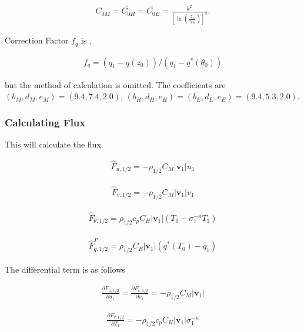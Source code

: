 \begin{eqnarray}
C_{0M}  =  \widetilde{C_{0H}}  =  \widetilde{C_{0E}}  =
       \frac{k^2}{\left[\ln \left(\frac{z_1}{z_{0M}}\right)\right]^2 } .
\end{eqnarray}

Correction Factor \(f_q\) is ,

\begin{eqnarray}
  f_q = (q_1 - q(z_0))/(q_1 - q^{\ast}(\theta_0))
\end{eqnarray}

but the method of calculation is omitted. The coefficients are
\(( b_M, d_M, e_M ) = ( 9.4, 7.4, 2.0 )\),
\(( b_H, d_H, e_H ) = ( b_E, d_E, e_E ) = ( 9.4, 5.3, 2.0 )\).

\hypertarget{calculating-flux}{%
\subsubsection{Calculating Flux}\label{calculating-flux}}

This will calculate the flux.

\begin{eqnarray}
\hat{F}_{u,1/2}  =  - \rho_{1/2} C_M |{\mathbf{v}}_1| u_1
\end{eqnarray}

\begin{eqnarray}
\hat{F}_{v,1/2}  =  - \rho_{1/2} C_M |{\mathbf{v}}_1| v_1
\end{eqnarray}

\begin{eqnarray}
\hat{F}_{\theta,1/2}  = \rho_{1/2} c_p C_H |{\mathbf{v}}_1|
                    \left( T_0 - \sigma_1^{-\kappa} T_1 \right)
\end{eqnarray}

\begin{eqnarray}
\hat{F}_{q,1/2}^P  =  \rho_{1/2} C_E |{\mathbf{v}}_1|
                    \left( q^*(T_0) - q_1 \right)
\end{eqnarray}

The differential term is as follows

\begin{eqnarray}
\frac{\partial{F_{u,1/2}}}{\partial {u_1}} = \frac{\partial{F_{v,1/2}}}{\partial {v_1}}
= - \rho_{1/2} C_M |{\mathbf{v}}_1|
\end{eqnarray}

\begin{eqnarray}
\frac{\partial{F_{\theta,1/2}}}{\partial {T_1}}
= - \rho_{1/2} c_p C_H |{\mathbf{v}}_1| \sigma_1^{-\kappa}
\end{eqnarray}

